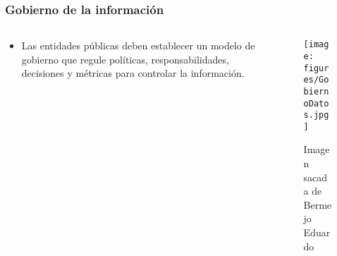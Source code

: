 \begin{frame}[allowframebreaks]

  \frametitle{Gobierno de la información}

  \begin{columns}
    \begin{column}{.5\textwidth}
      \begin{itemize}
        \item Las entidades públicas deben establecer un modelo de gobierno que regule políticas, responsabilidades, decisiones y métricas para controlar la información.
      \end{itemize}  
    \end{column}

    \begin{column}{.5\textwidth}
      \begin{figure}[ht]
        \centering
        \texttt{[image: figures/GobiernoDatos.jpg]}
        \caption{Imagen sacada de Bermejo Eduardo\cite{bermejo2023claves}}
      \end{figure}

    \end{column}
  \end{columns}  

  


\end{frame}

  


